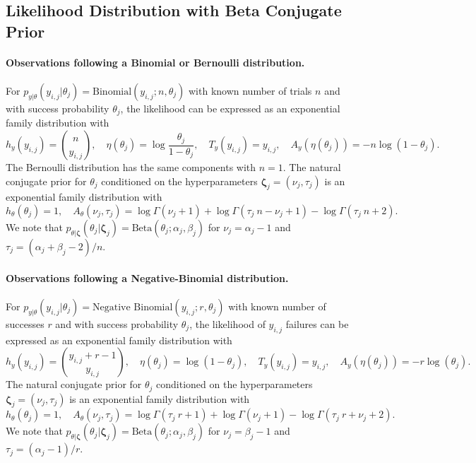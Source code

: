 %
%


\subsection{Likelihood Distribution with Beta Conjugate Prior}
\paragraph{Observations following a Binomial or Bernoulli distribution.} 
For $p_{{y}\vert{\theta}}({y}_{i,j} \vert {\theta}_j) = \text{Binomial}({y}_{i,j};n, {\theta}_j)$ with known number of trials $n$ and with success probability $\theta_j$, the likelihood can be expressed as an exponential family distribution with
\begin{equation*}
h_y({y}_{i,j}) =  \binom{n}{{y}_{i,j}}  ,\quad \eta(\theta_j) = \log \frac{\theta_j}{1-\theta_j} ,\quad T_y({y}_{i,j}) = {y}_{i,j},\quad {A}_{{y}}({\eta}({\theta}_j)) =  - n \log(1-\theta_j).
\end{equation*}
The Bernoulli distribution has the same components with $n=1$.
The natural conjugate prior for ${\theta}_j$ conditioned on the hyperparameters $\boldsymbol{\zeta}_j = (\nu_j, \tau_j)$ is an exponential family distribution with 
\begin{equation*} 
h_{{\theta}}({\theta}_j) = 1, \quad A_{\theta}({\nu}_j, {\tau}_j) = \log \Gamma(\nu_j  + 1)+ \log \Gamma(\tau_j \: n - \nu_j + 1) - \log \Gamma(\tau_j \: n + 2) .
\end{equation*}
We note that $p_{\theta\vert \boldsymbol{\zeta}}(\theta_j\vert \boldsymbol{\zeta}_j)= \text{Beta}(\theta_j;\alpha_j,\beta_j)$ for $\nu_j=\alpha_j-1$ and $\tau_j= (\alpha_j + \beta_j -2) / n$.

\paragraph{Observations following a Negative-Binomial distribution.} 
For $p_{{y}\vert{\theta}}({y}_{i,j} \vert {\theta}_j) = \text{Negative Binomial}({y}_{i,j};r, {\theta}_j)$ with known number of successes $r$ and with success probability $\theta_j$, the likelihood of ${y}_{i,j}$ failures can be expressed as an exponential family distribution with
\begin{equation*}
h_y({y}_{i,j}) =  \binom{{y}_{i,j} + r -1}{{y}_{i,j}}  ,\quad \eta(\theta_j) = \log (1-\theta_j) ,\quad T_y({y}_{i,j}) = {y}_{i,j},\quad {A}_{{y}}({\eta}({\theta}_j)) =  - r \log(\theta_j).
\end{equation*}
The natural conjugate prior for ${\theta}_j$ conditioned on the hyperparameters $\boldsymbol{\zeta}_j = (\nu_j, \tau_j)$ is an exponential family distribution with
\begin{equation*} 
h_{{\theta}}({\theta}_j) = 1, \quad A_{\theta}({\nu}_j, {\tau}_j) = \log \Gamma(\tau_j \: r + 1) + \log \Gamma(\nu_j  + 1) - \log \Gamma(\tau_j \: r + \nu_j + 2) .
\end{equation*}
We note that $p_{\theta\vert \boldsymbol{\zeta}}(\theta_j\vert \boldsymbol{\zeta}_j)= \text{Beta}(\theta_j;\alpha_j,\beta_j)$ for $\nu_j=\beta_j-1$ and $\tau_j= (\alpha_j -1) / r$.


